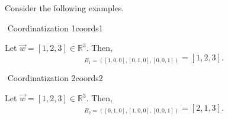        \vphantom
        \\
        \\
        Consider the following examples.
        \begin{example}{\Difficulty\,\,Coordinatization 1}{coords1}

            Let \(\vec{w}=[1,2,3]\in\mathbb{R}^3\). Then,
            \begin{equation*}
                [\vec{w}]_{B_1=([1,0,0],[0,1,0],[0,0,1])}=[1,2,3].
            \end{equation*}
            
        \end{example}
        \begin{example}{\Difficulty\,\,Coordinatization 2}{coords2}

            Let \(\vec{w}=[1,2,3]\in\mathbb{R}^3\). Then,
            \begin{equation*}
                [\vec{w}]_{B_2=([0,1,0],[1,0,0],[0,0,1])}=[2,1,3].
            \end{equation*}
            
        \end{example}
